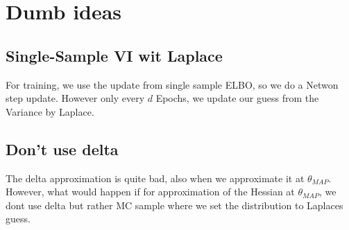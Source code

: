 \documentclass[a4paper]{scrartcl}
\begin{document}
\section{Dumb ideas}
  \subsection{Single-Sample VI wit Laplace}
    For training, we use the update from single sample ELBO, so we do a Netwon step update. However only
    every $d$ Epochs, we update our guess from the Variance by Laplace.

  \subsection{Don't use delta}
    The delta approximation is quite bad, also when we approximate it at
    $\theta_{MAP}$. However, what would happen if for approximation of the
    Hessian at $\theta_{MAP}$, we dont use delta but rather MC sample where we
    set the distribution to Laplaces guess.
    
      
\end{document}
